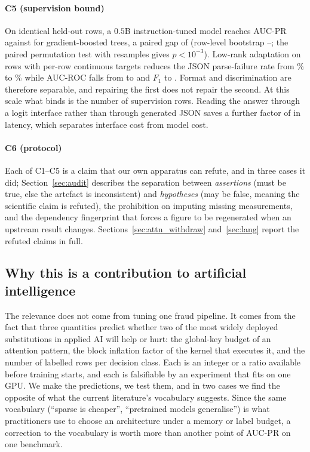 \paragraph{C5 (supervision bound)} On identical held-out rows, a $0.5$B
instruction-tuned model reaches AUC-PR \LlmAucPr{} against \GbdtSameAucPr{} for
gradient-boosted trees, a paired gap of \LlmDelta{} (row-level bootstrap
\LlmCiLo--\LlmCiHi; the paired permutation test with \PermSamples{} resamples gives
$p<10^{-3}$). Low-rank adaptation \cite{hu2022lora} on
\SftRows{} rows with per-row continuous targets reduces the JSON parse-failure
rate from \ParseFailZero\% to \SftParseFail\% while AUC-ROC falls from
\LlmAucRoc{} to \SftAucRoc{} and $F_1$ to \SftFOne. Format and discrimination are
therefore separable, and repairing the first does not repair the second. At this
scale what binds is the number of supervision rows. Reading the answer through a
logit interface rather than through generated JSON saves a further factor of
\InterfaceRatio{} in latency, which separates interface cost from model cost.

\paragraph{C6 (protocol)} Each of C1--C5 is a claim that our own apparatus can
refute, and in three cases it did; Section~\ref{sec:audit} describes the
separation between \emph{assertions} (must be true, else the artefact is
inconsistent) and \emph{hypotheses} (may be false, meaning the scientific claim
is refuted), the prohibition on imputing missing measurements, and the
dependency fingerprint that forces a figure to be regenerated when an upstream
result changes. Sections~\ref{sec:attn_withdraw} and~\ref{sec:lang} report the
refuted claims in full.

\subsection{Why this is a contribution to artificial intelligence}

The relevance does not come from tuning one fraud pipeline. It comes from the
fact that three quantities predict whether two of the most widely deployed
substitutions in applied AI will help or hurt: the global-key budget of an
attention pattern, the block inflation factor of the kernel that executes it, and
the number of labelled rows per decision class. Each is an integer or a ratio
available before training starts, and each is falsifiable by an experiment that
fits on one GPU. We make the predictions, we test them, and
in two cases we find the opposite of what the current literature's vocabulary
suggests. Since the same vocabulary (``sparse is cheaper'', ``pretrained models
generalise'') is what practitioners use to choose an architecture under a memory
or label budget, a correction to the vocabulary is worth more than another point
of AUC-PR on one benchmark.

